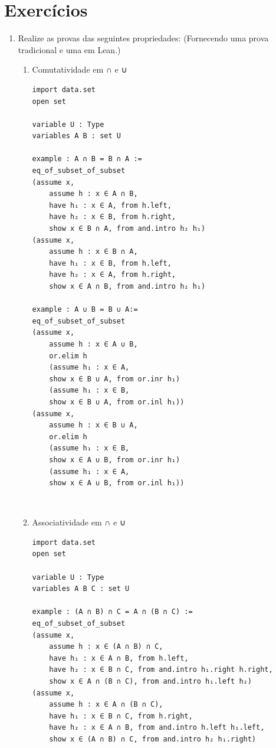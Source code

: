 \section{Exercícios}
\begin{enumerate}

\item Realize as provas das seguintes propriedades: (Fornecendo uma prova tradicional e uma em Lean.)

\begin{enumerate}

\item Comutatividade em ∩ e ∪
\begin{lstlisting}
import data.set
open set

variable U : Type
variables A B : set U

example : A ∩ B = B ∩ A :=
eq_of_subset_of_subset
(assume x,
    assume h : x ∈ A ∩ B,
    have h₁ : x ∈ A, from h.left,
    have h₂ : x ∈ B, from h.right,
    show x ∈ B ∩ A, from and.intro h₂ h₁)
(assume x,
    assume h : x ∈ B ∩ A,
    have h₁ : x ∈ B, from h.left,
    have h₂ : x ∈ A, from h.right,
    show x ∈ A ∩ B, from and.intro h₂ h₁)

example : A ∪ B = B ∪ A:=
eq_of_subset_of_subset
(assume x,
    assume h : x ∈ A ∪ B,
    or.elim h
    (assume h₁ : x ∈ A,
    show x ∈ B ∪ A, from or.inr h₁)
    (assume h₁ : x ∈ B,
    show x ∈ B ∪ A, from or.inl h₁))
(assume x,
    assume h : x ∈ B ∪ A,
    or.elim h
    (assume h₁ : x ∈ B,
    show x ∈ A ∪ B, from or.inr h₁)
    (assume h₁ : x ∈ A,
    show x ∈ A ∪ B, from or.inl h₁)) \end{lstlisting}

$\qquad$
\item Associatividade em ∩ e ∪
\begin{lstlisting}
import data.set
open set

variable U : Type
variables A B C : set U

example : (A ∩ B) ∩ C = A ∩ (B ∩ C) :=
eq_of_subset_of_subset
(assume x,
    assume h : x ∈ (A ∩ B) ∩ C,
    have h₁ : x ∈ A ∩ B, from h.left,
    have h₂ : x ∈ B ∩ C, from and.intro h₁.right h.right,
    show x ∈ A ∩ (B ∩ C), from and.intro h₁.left h₂) 
(assume x,
    assume h : x ∈ A ∩ (B ∩ C),
    have h₁ : x ∈ B ∩ C, from h.right,
    have h₂ : x ∈ A ∩ B, from and.intro h.left h₁.left,
    show x ∈ (A ∩ B) ∩ C, from and.intro h₂ h₁.right) 


\end{lstlisting}
\end{enumerate}
\end{enumerate}
